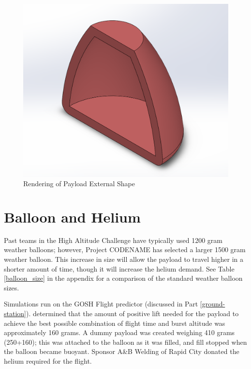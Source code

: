 \documentclass[english]{report}
\begin{document}
\begin{figure}[H]
\begin{centering}
\includegraphics[scale=0.5]{./images/shape}
\par\end{centering}
\caption{Rendering of Payload External Shape}

\end{figure}


\newpage
\section{Balloon and Helium}
Past teams in the High Altitude Challenge have typically used 1200 gram weather balloons; however, Project CODENAME has selected a larger 1500 gram weather balloon.  This increase in size will allow the payload to travel higher in a shorter amount of time, though it will increase the helium demand.  See Table \ref{balloon_size} in the appendix for a comparison of the standard weather balloon sizes\cite{balloon-performance-calculator}.

Simulations run on the GOSH Flight predictor (discussed in Part \ref{ground-station}). determined that the  amount of positive lift needed for the payload to achieve the best possible combination of flight time and burst altitude was approximately 160 grams.  A dummy payload was created weighing 410 grams (250+160); this was attached to the balloon as it was filled, and fill stopped when the balloon became buoyant.  Sponsor A\&B Welding of Rapid City donated the helium required for the flight.
\end{document}

